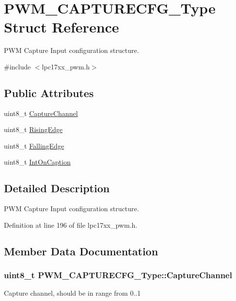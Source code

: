 \hypertarget{struct_p_w_m___c_a_p_t_u_r_e_c_f_g___type}{\section{\-P\-W\-M\-\_\-\-C\-A\-P\-T\-U\-R\-E\-C\-F\-G\-\_\-\-Type \-Struct \-Reference}
\label{struct_p_w_m___c_a_p_t_u_r_e_c_f_g___type}
}


\-P\-W\-M \-Capture \-Input configuration structure.  




{\ttfamily \#include $<$lpc17xx\-\_\-pwm.\-h$>$}

\subsection*{\-Public \-Attributes}
\begin{DoxyCompactItemize}
\item 
uint8\-\_\-t \hyperlink{struct_p_w_m___c_a_p_t_u_r_e_c_f_g___type_af2799b506fc45bcb45e8b590c0e4ed09}{\-Capture\-Channel}
\item 
uint8\-\_\-t \hyperlink{struct_p_w_m___c_a_p_t_u_r_e_c_f_g___type_ad10b8ea8b8787126461930fc818ffd50}{\-Rising\-Edge}
\item 
uint8\-\_\-t \hyperlink{struct_p_w_m___c_a_p_t_u_r_e_c_f_g___type_a071675984cbb68eae6d11323188eec27}{\-Falling\-Edge}
\item 
uint8\-\_\-t \hyperlink{struct_p_w_m___c_a_p_t_u_r_e_c_f_g___type_ab89855a6f6f1a335ab30894982032b08}{\-Int\-On\-Caption}
\end{DoxyCompactItemize}


\subsection{\-Detailed \-Description}
\-P\-W\-M \-Capture \-Input configuration structure. 

\-Definition at line 196 of file lpc17xx\-\_\-pwm.\-h.



\subsection{\-Member \-Data \-Documentation}
\hypertarget{struct_p_w_m___c_a_p_t_u_r_e_c_f_g___type_af2799b506fc45bcb45e8b590c0e4ed09}{
\subsubsection[{\-Capture\-Channel}]{\setlength{\rightskip}{0pt plus 5cm}uint8\-\_\-t {\bf \-P\-W\-M\-\_\-\-C\-A\-P\-T\-U\-R\-E\-C\-F\-G\-\_\-\-Type\-::\-Capture\-Channel}}}\label{struct_p_w_m___c_a_p_t_u_r_e_c_f_g___type_af2799b506fc45bcb45e8b590c0e4ed09}
\-Capture channel, should be in range from 0..1 

